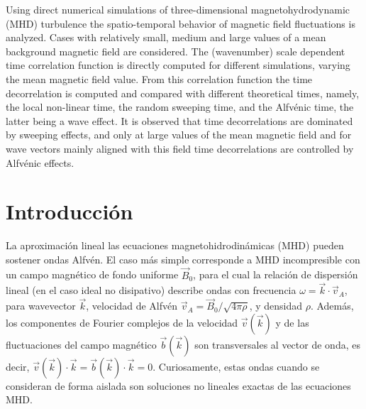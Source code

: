   Using direct numerical simulations of three-dimensional magnetohydrodynamic (MHD)
  turbulence the spatio-temporal behavior of magnetic field
  fluctuations is analyzed.  Cases with relatively small, medium and
  large values of a mean background magnetic field are considered. The
  (wavenumber) scale dependent time correlation function is directly
  computed for different simulations, varying the mean magnetic field
  value. From this correlation function the time decorrelation is
  computed and compared with different theoretical times, namely,
  the local non-linear time, the random sweeping time, and the
  Alfv\'enic time, the latter being a wave effect. It is observed that
  time decorrelations are dominated by sweeping effects, and only at
  large values of the mean magnetic field and for wave vectors mainly
  aligned with this field time decorrelations are controlled by
  Alfv\'enic effects.

\section{Introducción}\label{C4Sintro}

La aproximación lineal las ecuaciones magnetohidrodinámicas (MHD)
pueden sostener ondas Alfv\'en. El caso más simple corresponde a MHD
incompresible con un campo magnético de fondo uniforme $\vec{B}_0$,
para el cual la relación de dispersión lineal (en el caso ideal no
disipativo) describe ondas con frecuencia
$ \omega = \vec{k}\cdot\vec{v}_A$, para wavevector $\vec{k}$,
velocidad de Alfv\'en $\vec{v}_A = \vec{B}_0 / \sqrt{4\pi\rho}$, y
densidad $\rho$. Además, los componentes de Fourier complejos de la
velocidad $\vec{v}(\vec{k})$ y de las fluctuaciones del campo
magnético $\vec{b}(\vec{k})$ son transversales al vector de onda, es
decir,
$\vec{v}(\vec{k}) \cdot \vec{k} = \vec{b}(\vec{k}) \cdot \vec{k} =
0$. Curiosamente, estas ondas cuando se consideran de forma aislada
son soluciones no lineales exactas de las ecuaciones MHD.

